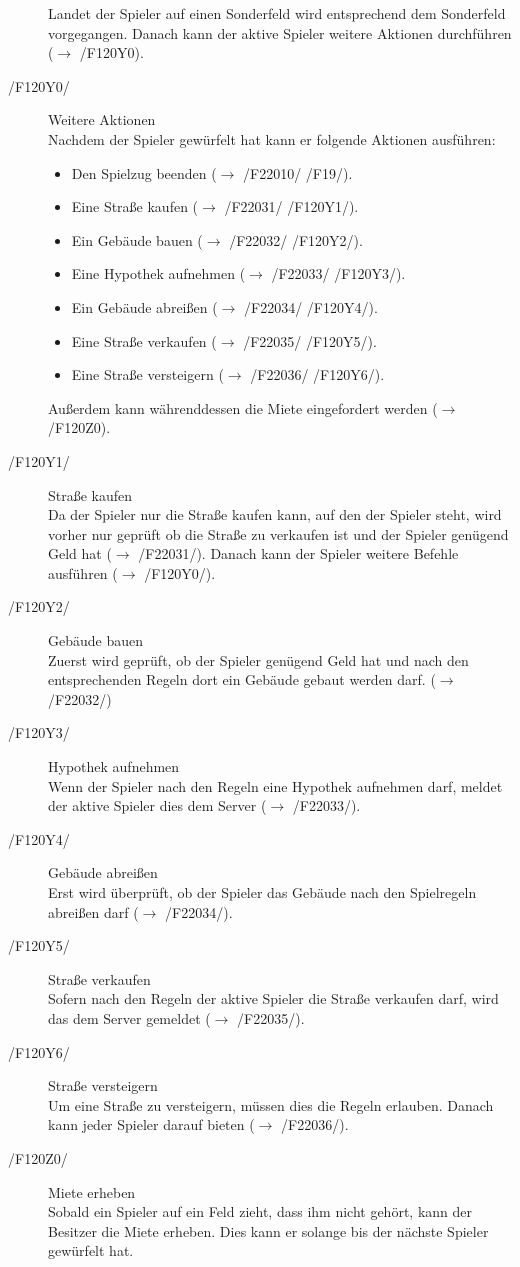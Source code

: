 \documentclass[a4paper,10pt]{article}
\begin{document}
\begin{description}
Landet der Spieler auf einen Sonderfeld wird entsprechend dem Sonderfeld vorgegangen. Danach kann der aktive Spieler weitere Aktionen durchführen ($\rightarrow$ /F120Y0).
\item[/F120Y0/] Weitere Aktionen \\
Nachdem der Spieler gewürfelt hat kann er folgende Aktionen ausführen:
\begin{itemize}
\item Den Spielzug beenden ($\rightarrow$ /F22010/ /F19/).
\item Eine Straße kaufen ($\rightarrow$ /F22031/ /F120Y1/).
\item Ein Gebäude bauen ($\rightarrow$ /F22032/ /F120Y2/).
\item Eine Hypothek aufnehmen ($\rightarrow$ /F22033/ /F120Y3/).
\item Ein Gebäude abreißen ($\rightarrow$ /F22034/ /F120Y4/).
\item Eine Straße verkaufen ($\rightarrow$ /F22035/ /F120Y5/).
\item Eine Straße versteigern ($\rightarrow$ /F22036/ /F120Y6/).
\end{itemize}
Außerdem kann währenddessen die Miete eingefordert werden ($\rightarrow$ /F120Z0).
\item[/F120Y1/] Straße kaufen \\
Da der Spieler nur die Straße kaufen kann, auf den der Spieler steht, wird vorher nur geprüft ob die Straße zu verkaufen ist und der Spieler genügend Geld hat ($\rightarrow$ /F22031/). Danach kann der Spieler weitere Befehle ausführen ($\rightarrow$ /F120Y0/).
\item[/F120Y2/] Gebäude bauen \\
Zuerst wird geprüft, ob der Spieler genügend Geld hat und nach den entsprechenden Regeln dort ein Gebäude gebaut werden darf. ($\rightarrow$ /F22032/)
\item[/F120Y3/] Hypothek aufnehmen \\
Wenn der Spieler nach den Regeln eine Hypothek aufnehmen darf, meldet der aktive Spieler dies dem Server ($\rightarrow$ /F22033/).
\item[/F120Y4/] Gebäude abreißen \\
Erst wird überprüft, ob der Spieler das Gebäude nach den Spielregeln abreißen darf ($\rightarrow$ /F22034/).
\item[/F120Y5/] Straße verkaufen \\
Sofern nach den Regeln der aktive Spieler die Straße verkaufen darf, wird das dem Server gemeldet ($\rightarrow$ /F22035/).
\item[/F120Y6/] Straße versteigern \\
Um eine Straße zu versteigern, müssen dies die Regeln erlauben. Danach kann jeder Spieler darauf bieten ($\rightarrow$ /F22036/).
\item[/F120Z0/] Miete erheben \\
Sobald ein Spieler auf ein Feld zieht, dass ihm nicht gehört, kann der Besitzer die Miete erheben. Dies kann er solange bis der nächste Spieler gewürfelt hat.


\end{description}
\end{document}
